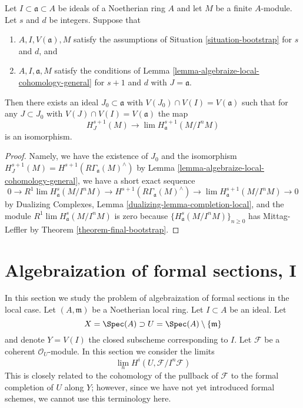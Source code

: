 \begin{lemma}
\label{lemma-combine-two}
Let $I \subset \mathfrak a \subset A$ be ideals of a Noetherian ring $A$
and let $M$ be a finite $A$-module. Let $s$ and $d$ be integers.
Suppose that
\begin{enumerate}
\item $A, I, V(\mathfrak a), M$ satisfy the assumptions of
Situation \ref{situation-bootstrap} for $s$ and $d$, and
\item $A, I, \mathfrak a, M$ satisfy the conditions of
Lemma \ref{lemma-algebraize-local-cohomology-general}
for $s + 1$ and $d$ with $J = \mathfrak a$.
\end{enumerate}
Then there exists an ideal
$J_0 \subset \mathfrak a$ with $V(J_0) \cap V(I) = V(\mathfrak a)$
such that for any $J \subset J_0$ with $V(J) \cap V(I) = V(\mathfrak a)$
the map
$$
H^{s + 1}_J(M) \longrightarrow \lim H^{s + 1}_\mathfrak a(M/I^nM)
$$
is an isomorphism.
\end{lemma}

\begin{proof}
Namely, we have the existence of $J_0$
and the isomorphism
$H^{s + 1}_J(M) = H^{s + 1}(R\Gamma_\mathfrak a(M)^\wedge)$
by Lemma \ref{lemma-algebraize-local-cohomology-general},
we have a short exact sequence
$$
0 \to R^1\lim H^s_\mathfrak a(M/I^nM) \to
H^{s + 1}(R\Gamma_\mathfrak a(M)^\wedge) \to
\lim H^{s + 1}_\mathfrak a(M/I^nM) \to 0
$$
by Dualizing Complexes, Lemma \ref{dualizing-lemma-completion-local},
and the module $R^1\lim H^s_\mathfrak a(M/I^nM)$ is zero because
$\{H^s_\mathfrak a(M/I^nM)\}_{n \geq 0}$ has Mittag-Leffler
by Theorem \ref{theorem-final-bootstrap}.
\end{proof}








\section{Algebraization of formal sections, I}
\label{section-algebraization-sections}

\noindent
In this section we study the problem of algebraization of
formal sections in the local case.
Let $(A, \mathfrak m)$ be a Noetherian local ring.
Let $I \subset A$ be an ideal. Let
$$
X = \Spec(A) \supset U = \Spec(A) \setminus \{\mathfrak m\}
$$
and denote $Y = V(I)$ the closed subscheme corresponding to $I$.
Let $\mathcal{F}$ be a coherent $\mathcal{O}_U$-module.
In this section we consider the limits
$$
\lim_n H^i(U, \mathcal{F}/I^n\mathcal{F})
$$
This is closely related to the cohomology of the pullback
of $\mathcal{F}$ to the formal completion of $U$ along $Y$;
however, since we have not yet introduced formal schemes,
we cannot use this terminology here.

